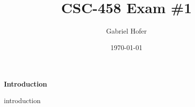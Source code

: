 \documentclass[12pt]{article}
\begin{document}
\title{CSC-458 Exam \#1}
\author{Gabriel Hofer}
\date{\today}
\maketitle
\noindent \textbf{Introduction} \par
introduction
\end{document}

